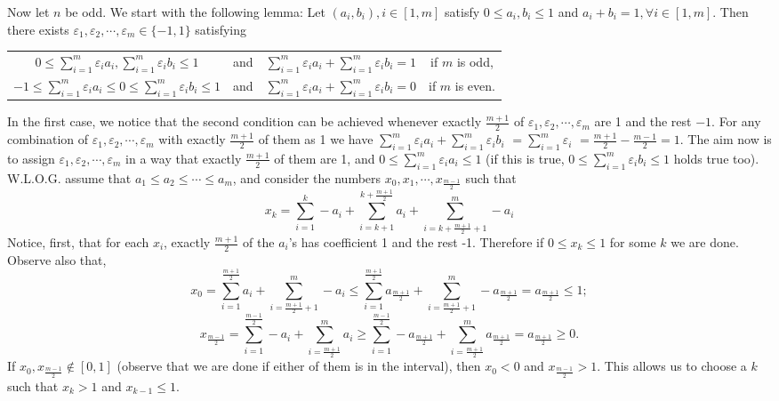 \documentclass[11pt,a4paper]{article}
\begin{document}
\begin{itemize}
Now let $n$ be odd. 
We start with the following lemma: 
Let $(a_i, b_i), i\in [1,m]$ satisfy $0\le a_i, b_i\le 1$ and $a_i+b_i=1, \forall i\in [1,m]$. 
Then there exists $\varepsilon_1, \varepsilon_2, \cdots, \varepsilon_m\in \{-1, 1\}$ satisfying
\begin{center}
\begin{tabular}{c c c c} 
$0\le \sum_{i=1}^m \varepsilon_i a_i, \sum_{i=1}^m \varepsilon_i b_i\le 1$
& and & $\sum_{i=1}^m \varepsilon_i a_i +\sum_{i=1}^m \varepsilon_i b_i=1$ & if  $m$ is odd, \\ 
$-1\le \sum_{i=1}^m \varepsilon_i a_i\le 0\le\sum_{i=1}^m \varepsilon_i b_i\le 1$
& and & $\sum_{i=1}^m \varepsilon_i a_i +\sum_{i=1}^m \varepsilon_i b_i=0$ & if  $m$ is even. \\ 
\end{tabular} 
\end{center}
In the first case, we notice that the second condition can be achieved whenever exactly $\frac{m+1}2$ of $\varepsilon_1, \varepsilon_2, \cdots , \varepsilon_m$ are 1 and the rest $-1$. 
For any combination of $\varepsilon_1, \varepsilon_2, \cdots , \varepsilon_m$ with exactly $\frac{m+1}{2}$ of them as 1 we have 
$ \sum_{i=1}^m \varepsilon_i a_i  + \sum_{i=1}^m \varepsilon_i b_i $
$=\sum_{i=1}^m \varepsilon_i$
$=\frac{m+1}{2}-\frac{m-1}{2}=1$. 
The aim now is to assign $\varepsilon_1, \varepsilon_2, \cdots , \varepsilon_m$ 
in a way that exactly $\frac{m+1}2$ of them are 1, and $0\le \sum_{i=1}^m \varepsilon_i a_i\le 1$ 
(if this is true, $0\le \sum_{i=1}^m \varepsilon_i b_i\le 1$ holds true too). 
W.L.O.G. assume that $a_1\le a_2\le\cdots \le a_m$, and consider the numbers 
$x_0, x_1, \cdots , x_{\frac{m-1}2}$ such that 
\[ x_k=\sum_{i=1}^{k} -a_i+\sum_{i=k+1}^{k+\frac{m+1}{2}} a_i+\sum_{i=k+\frac{m+1}{2}+1}^{m} -a_i\]
Notice, first, that for each $x_i$, exactly $\frac{m+1}{2}$ of the $a_i$'s has coefficient 1 and the rest -1. 
Therefore if $0\le x_k\le 1$ for some $k$ we are done. 
Observe also that, 
\[x_0=\sum_{i=1}^{\frac{m+1}{2}} a_i+\sum_{i=\frac{m+1}{2}+1}^{m} -a_i
\le \sum_{i=1}^{\frac{m+1}{2}} a_{\frac{m+1}{2}} +\sum_{i=\frac{m+1}{2}+1}^{m} -a_{\frac{m+1}{2}}
=a_{\frac{m+1}{2}}
\le 1;\]
\[x_{\frac{m-1}{2}}=\sum_{i=1}^{\frac{m-1}{2}} -a_i+\sum_{i=\frac{m+1}{2}}^{m} a_i
\ge \sum_{i=1}^{\frac{m-1}{2}} -a_{\frac{m+1}{2}}+\sum_{i=\frac{m+1}{2}}^{m} a_{\frac{m+1}{2}}
=a_{\frac{m+1}{2}}
\ge 0.\] 
If $x_0, x_{\frac{m-1}{2}}\not\in [0, 1]$ (observe that we are done if either of them is in the interval), then $x_0<0$ and $x_{\frac{m-1}{2}}>1$. 
This allows us to choose a $k$ such that $x_k>1$ and $x_{k-1}\le 1$. 

\end{itemize}
\end{document}
